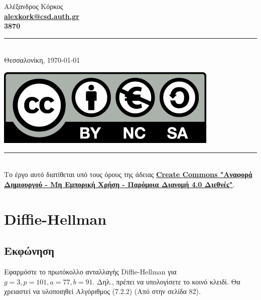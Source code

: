 \documentclass[oneside]{article}
\newcommand{\Rule}{\rule{\linewidth}{0.5mm}}
\begin{document}
\begin{titlepage}
    \vspace*{\fill}
    
    \begin{center}
        Αλέξανδρος Κόρκος \\
        \textbf{\href{mailto:alexkork@csd.auth.gr}{alexkork@csd.auth.gr}}\\
        \textbf{3870}
        \Rule \\[0.4cm]
        Θεσσαλονίκη, \today
    \end{center}
    
\end{titlepage}

\vspace*{\fill}

\begin{center}
    \href{https://creativecommons.org/licenses/by-nc-sa/4.0/deed.el}{\includegraphics[scale=0.2]{Images/cc.png}} \\
    \Rule \\[0.4cm]
    Το έργο αυτό διατίθεται υπό τους όρους της άδειας \textbf{\href{https://creativecommons.org/licenses/by-nc-sa/4.0/deed.el}{Create Commons "Αναφορά Δημιουργού - Μη Εμπορική Χρήση - Παρόμοια Διανομή 4.0 Διεθνές"}}. \\ 
\end{center}

\newpage

\tableofcontents

\newpage

\section{Diffie-Hellman}

\subsection{Εκφώνηση} 

Εφαρμόστε το πρωτόκολλο ανταλλαγής Diffie-Hellman για $g = 3, p = 101, a = 77, b = 91$. Δηλ., πρέπει να υπολογίσετε το κοινό κλειδί. Θα χρειαστεί να υλοποιηθεί Αλγόριθμος (7.2.2) (Από \cite{draz:2022} στην σελίδα 82).
\end{document}

